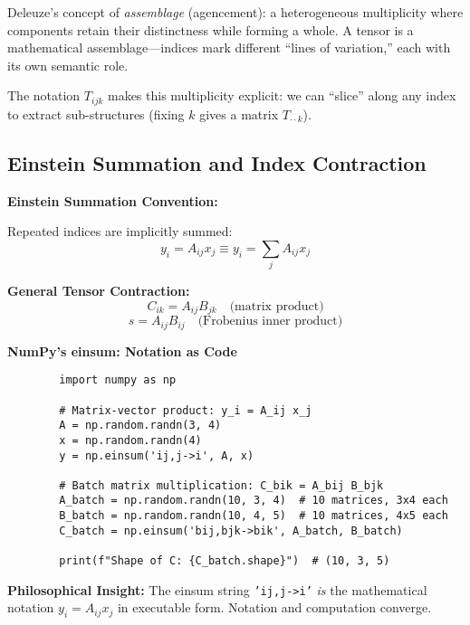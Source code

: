 \begin{philosophical}
	Deleuze's concept of \textit{assemblage} (agencement): a heterogeneous multiplicity where components retain their distinctness while forming a whole. A tensor is a mathematical assemblage---indices mark different ``lines of variation,'' each with its own semantic role.
	
	The notation $T_{ijk}$ makes this multiplicity explicit: we can ``slice'' along any index to extract sub-structures (fixing $k$ gives a matrix $T_{\cdot\cdot k}$).
\end{philosophical}

\subsection{Einstein Summation and Index Contraction}

\begin{seanbox}{1.6}
	\textbf{Einstein Summation Convention:}
	
	Repeated indices are implicitly summed:
	\begin{equation}
		y_i = A_{ij} x_j \equiv y_i = \sum_{j} A_{ij} x_j
	\end{equation}
	
	\textbf{General Tensor Contraction:}
	\begin{equation}
		C_{ik} = A_{ij} B_{jk} \quad \text{(matrix product)}
	\end{equation}
	\begin{equation}
		s = A_{ij} B_{ij} \quad \text{(Frobenius inner product)}
	\end{equation}
\end{seanbox}

\begin{codebox}
	\textbf{NumPy's einsum: Notation as Code}
	
	\begin{lstlisting}
		import numpy as np
		
		# Matrix-vector product: y_i = A_ij x_j
		A = np.random.randn(3, 4)
		x = np.random.randn(4)
		y = np.einsum('ij,j->i', A, x)
		
		# Batch matrix multiplication: C_bik = A_bij B_bjk
		A_batch = np.random.randn(10, 3, 4)  # 10 matrices, 3x4 each
		B_batch = np.random.randn(10, 4, 5)  # 10 matrices, 4x5 each
		C_batch = np.einsum('bij,bjk->bik', A_batch, B_batch)
		
		print(f"Shape of C: {C_batch.shape}")  # (10, 3, 5)
	\end{lstlisting}
	
	\textbf{Philosophical Insight:} The einsum string \texttt{'ij,j->i'} \textit{is} the mathematical notation $y_i = A_{ij} x_j$ in executable form. Notation and computation converge.
\end{codebox}

